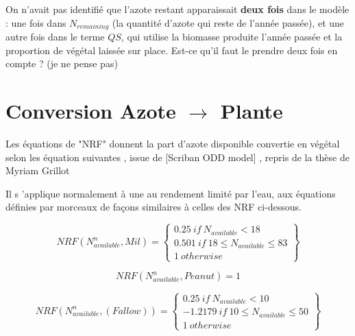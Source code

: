 \documentclass[10pt,a4paper,french]{article} %
\begin{document}
\begin{tcolorbox}[noparskip,
    colback=LightGreen,colframe=DarkGreen,%
    colbacklower=LimeGreen!75!LightGreen,%
    title=Question]
On n'avait pas identifié que l'azote restant apparaissait \textbf{deux fois} dans le modèle : une fois dans $N_{remaining}$ (la quantité d'azote qui reste de l'année passée), et une autre fois dans le terme $QS$, qui utilise la biomasse produite l'année passée et la proportion de végétal laissée sur place. Est-ce qu'il faut le prendre deux fois en compte ? (je ne pense pas)
\end{tcolorbox}


\section{Conversion Azote $\rightarrow$ Plante}



Les équations de "NRF" donnent la part d'azote disponible convertie en végétal selon les équation suivantes , issue de [Scriban ODD model]  , repris de la thèse de Myriam Grillot 


Il s 'applique normalement à une au rendement limité par l'eau,  aux équations définies par morceaux de façons similaires à celles des NRF  ci-dessous. 

\begin{equation}
  NRF(N_{available}^n,Mil)=\left\{
                \begin{array}{ll}
                  0.25 \ if \ N_{available} < 18\\
                0.501 \ if \ 18 \leq N_{available} \leq 83  \\
                  1 \ otherwise
                \end{array}
              \right\} 
 \end{equation} 

\begin{equation}
   NRF(N_{available}^n,Peanut)=1
  \end{equation} 
 

 \begin{equation}
   NRF(N_{available}^n,(Fallow))=\left\{
                \begin{array}{ll}
                  0.25 \ if \ N_{available} < 10\\
                -1.2179 \ if \ 10 \leq N_{available} \leq 50  \\
                  1 \ otherwise
                \end{array}
              \right\}
  \end{equation} 
  
\end{document}
